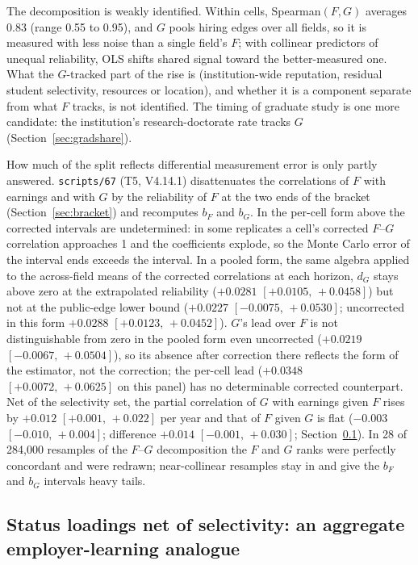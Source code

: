 \documentclass[11pt]{article}
\newcommand{\ci}[2]{$[#1,\allowbreak\,#2]$}
\newcommand{\scr}[1]{\texttt{scripts/#1}}
\begin{document}
The decomposition is weakly identified. Within cells, Spearman$(F,G)$ averages 0.83 (range 0.55 to 0.95), and $G$
pools hiring edges over all fields, so it is measured with less noise than a single field's $F$; with collinear
predictors of unequal reliability, OLS shifts shared signal toward the better-measured one. What the $G$-tracked
part of the rise is (institution-wide reputation, residual student selectivity, resources or location), and whether
it is a component separate from what $F$ tracks, is not identified. The timing of graduate study is one
more candidate: the institution's research-doctorate rate tracks $G$ (Section~\ref{sec:gradshare}).

How much of the split reflects differential measurement error is only partly answered. \scr{67} (T5, V4.14.1)
disattenuates the correlations of $F$ with earnings and with $G$ by the reliability of $F$ at the two ends of the
bracket (Section~\ref{sec:bracket}) and recomputes $b_F$ and $b_G$. In the per-cell form above the corrected
intervals are undetermined: in some replicates a cell's corrected $F$--$G$ correlation approaches 1 and the
coefficients explode, so the Monte Carlo error of the interval ends exceeds the interval. In a pooled form, the
same algebra applied to the across-field means of the corrected correlations at each horizon, $d_G$ stays above zero
at the extrapolated reliability ($+0.0281$ \ci{+0.0105}{+0.0458}) but not at the public-edge lower bound ($+0.0227$
\ci{-0.0075}{+0.0530}; uncorrected in this form $+0.0288$ \ci{+0.0123}{+0.0452}). $G$'s lead over $F$ is not
distinguishable from zero in the pooled form even uncorrected ($+0.0219$ \ci{-0.0067}{+0.0504}), so its absence after
correction there reflects the form of the estimator, not the correction; the per-cell lead ($+0.0348$
\ci{+0.0072}{+0.0625} on this panel) has no determinable corrected counterpart. Net of the selectivity set, the
partial correlation of $G$ with earnings given $F$ rises by $+0.012$ \ci{+0.001}{+0.022} per year and that of $F$
given $G$ is flat ($-0.003$ \ci{-0.010}{+0.004}; difference $+0.014$ \ci{-0.001}{+0.030}; Section~\ref{sec:emplearn}).
In 28 of 284,000 resamples of the $F$--$G$ decomposition the $F$ and $G$ ranks were
perfectly concordant and were redrawn; near-collinear resamples stay in and give the $b_F$ and $b_G$ intervals heavy
tails.

\subsection{Status loadings net of selectivity: an aggregate employer-learning analogue}\label{sec:emplearn}
\end{document}

